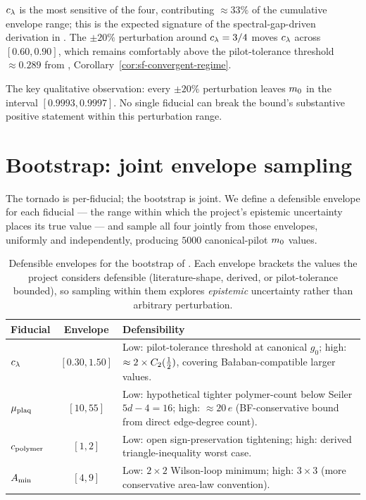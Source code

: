 $c_\lambda$ is the most sensitive of the four, contributing $\approx
33\%$ of the cumulative envelope range; this is the expected
signature of the spectral-gap-driven derivation in
.  The $\pm 20\%$ perturbation around
$c_\lambda = 3/4$ moves $c_\lambda$ across $[0.60, 0.90]$, which
remains comfortably above the pilot-tolerance threshold $\approx
0.289$ from ,
Corollary~\ref{cor:sf-convergent-regime}.

The key qualitative observation: every $\pm 20\%$ perturbation
leaves $m_0$ in the interval $[0.9993, 0.9997]$.  No single
fiducial can break the bound's substantive positive statement
within this perturbation range.

\section{Bootstrap: joint envelope sampling}
\label{sec:appx-bootstrap}

%

The tornado is per-fiducial; the bootstrap is joint.  We define a
defensible envelope for each fiducial — the range within which the
project's epistemic uncertainty places its true value — and sample
all four jointly from those envelopes, uniformly and independently,
producing $5000$ canonical-pilot $m_0$ values.

\begin{table}[h]
\centering
\renewcommand{\arraystretch}{1.2}
\begin{tabular}{lcp{8.5cm}}
\toprule
Fiducial    & Envelope        & Defensibility                                                          \\
\midrule
$c_\lambda$  & $[0.30, 1.50]$  & Low: pilot-tolerance threshold at canonical $g_0$; high: $\approx 2 \times C_2(\tfrac12)$, covering Bałaban-compatible larger values. \\
$\mu_{\mathrm{plaq}}$   & $[10, 55]$      & Low: hypothetical tighter polymer-count below Seiler $5d - 4 = 16$; high: $\approx 20\,e$ (BF-conservative bound from direct edge-degree count). \\
$c_{\mathrm{polymer}}$ & $[1, 2]$        & Low: open sign-preservation tightening; high: derived triangle-inequality worst case.  \\
$A_{\min}$     & $[4, 9]$        & Low: $2 \times 2$ Wilson-loop minimum; high: $3 \times 3$ (more conservative area-law convention).  \\
\bottomrule
\end{tabular}
\caption{Defensible envelopes for the bootstrap of
.  Each envelope brackets the values the
project considers defensible (literature-shape, derived, or
pilot-tolerance bounded), so sampling within them explores
\emph{epistemic} uncertainty rather than arbitrary perturbation.}
\label{tab:appx-envelopes}
\end{table}

